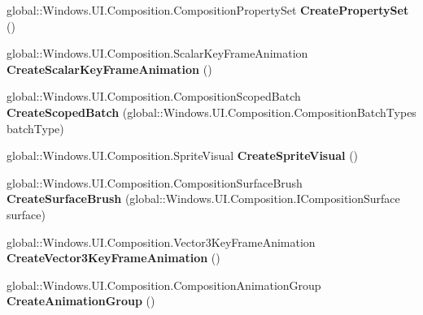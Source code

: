 \begin{DoxyCompactItemize}
\item 
\mbox{\label{class_windows_1_1_u_i_1_1_composition_1_1_compositor_a74091487764434fe783ce2e35bc897d2}} 
global\+::\+Windows.\+U\+I.\+Composition.\+Composition\+Property\+Set {\bfseries Create\+Property\+Set} ()
\item 
\mbox{\label{class_windows_1_1_u_i_1_1_composition_1_1_compositor_a1c091ff2583caeef8359702f57a8ee0d}} 
global\+::\+Windows.\+U\+I.\+Composition.\+Scalar\+Key\+Frame\+Animation {\bfseries Create\+Scalar\+Key\+Frame\+Animation} ()
\item 
\mbox{\label{class_windows_1_1_u_i_1_1_composition_1_1_compositor_a7ffb728cfd21a486270b346127894097}} 
global\+::\+Windows.\+U\+I.\+Composition.\+Composition\+Scoped\+Batch {\bfseries Create\+Scoped\+Batch} (global\+::\+Windows.\+U\+I.\+Composition.\+Composition\+Batch\+Types batch\+Type)
\item 
\mbox{\label{class_windows_1_1_u_i_1_1_composition_1_1_compositor_a74d76a5f9c181cabe102c81e114500ca}} 
global\+::\+Windows.\+U\+I.\+Composition.\+Sprite\+Visual {\bfseries Create\+Sprite\+Visual} ()
\item 
\mbox{\label{class_windows_1_1_u_i_1_1_composition_1_1_compositor_a281e5812822cbd2bb26434f086f15fc2}} 
global\+::\+Windows.\+U\+I.\+Composition.\+Composition\+Surface\+Brush {\bfseries Create\+Surface\+Brush} (global\+::\+Windows.\+U\+I.\+Composition.\+I\+Composition\+Surface surface)
\item 
\mbox{\label{class_windows_1_1_u_i_1_1_composition_1_1_compositor_af205bcd47f5aca9d484b62336a89d804}} 
global\+::\+Windows.\+U\+I.\+Composition.\+Vector3\+Key\+Frame\+Animation {\bfseries Create\+Vector3\+Key\+Frame\+Animation} ()
\item 
\mbox{\label{class_windows_1_1_u_i_1_1_composition_1_1_compositor_a80a2b13bdd26b7fead234728f4e048a4}} 
global\+::\+Windows.\+U\+I.\+Composition.\+Composition\+Animation\+Group {\bfseries Create\+Animation\+Group} ()

\end{DoxyCompactItemize}
